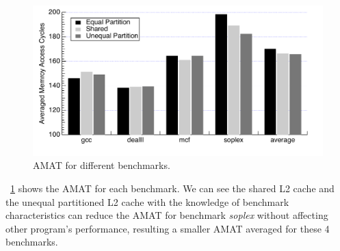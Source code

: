 \documentclass[12pt]{report}
\newcommand{\Fig}[1]{\figurename~\ref{#1}}
\begin{document}
\begin{figure}[b]
 \centering
\begin{minipage}[b]{0.7\textwidth}
 \centering
 \includegraphics[trim=0mm 0mm 0mm 0mm,clip,width=\linewidth]{figs/bench_stats.pdf}
 \caption{AMAT for different benchmarks.}
 \label{bench_stats}
\end{minipage}
\end{figure}

\Fig{bench_stats} shows the AMAT for each benchmark. We can see the shared L2 cache and the unequal partitioned L2 cache with the knowledge of benchmark characteristics can reduce the AMAT for benchmark \emph{soplex} without affecting other program's performance, resulting a smaller AMAT averaged for these 4 benchmarks.
\end{document}
